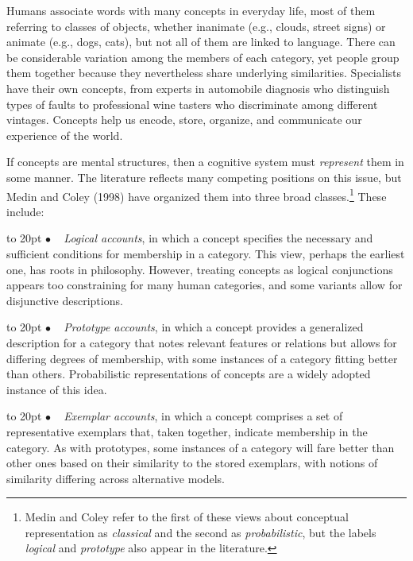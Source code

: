 \documentclass[11pt,letterpaper]{article}
\def\texitem#1{\par\noindent\hangindent 20pt
               \hbox to 20pt {\hss #1 ~}\ignorespaces}
\def\bull{\texitem{$\bullet$}}
\begin{document}
Humans associate words with many concepts in everyday life, most of them
  referring to classes of objects, whether inanimate (e.g., clouds, 
  street signs) or animate (e.g., dogs, cats), but not all of them are 
  linked to language. 
There can be considerable variation among the members of each category, 
  yet people group them together because they nevertheless share underlying 
  similarities. 
Specialists have their own concepts, from experts in automobile 
  diagnosis who distinguish types of faults to professional wine 
  tasters who discriminate among different vintages. 
Concepts help us encode, store, organize, and communicate our experience 
  of the world.   


If concepts are mental structures, then a cognitive system must
  {\it represent\/} them in some manner.
The literature reflects many competing positions on this issue, but 
  Medin and Coley (1998) have organized them into three broad 
  classes.\footnote{Medin and Coley refer to the first of these views 
  about conceptual representation as {\it classical\/} and the second 
  as {\it probabilistic\/}, but the labels {\it logical\/} and {\it 
  prototype\/} also appear in the literature.} 
These include: 

\vskip 0.05in
\noindent

\bull
{\it Logical accounts\/}, in which a concept specifies the necessary and 
  sufficient conditions for membership in a category.
This view, perhaps the earliest one, has roots in philosophy. 
However, treating concepts as logical conjunctions appears too 
  constraining for many human categories, and some variants allow 
  for disjunctive descriptions. 

\bull
{\it Prototype accounts\/}, in which a concept provides a generalized 
  description for a category that notes relevant features or relations 
  but allows for differing degrees of membership, with some instances 
  of a category fitting better than others. Probabilistic representations 
  of concepts are a widely adopted instance of this idea. 

\bull
{\it Exemplar accounts\/}, in which a concept comprises a set of 
  representative exemplars that, taken together, indicate membership 
  in the category. As with prototypes, some instances of a category 
  will fare better than other ones based on their similarity to the 
  stored exemplars, with notions of similarity differing across 
  alternative models. 
\end{document}
